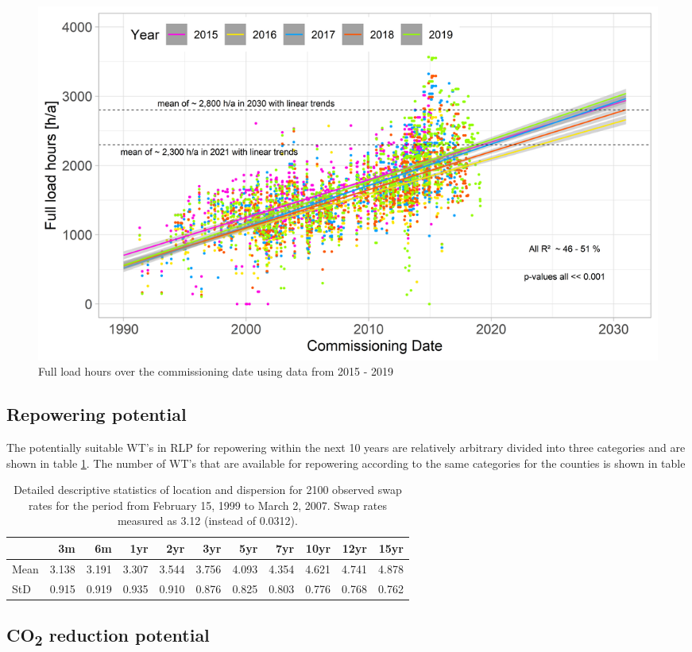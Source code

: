 \documentclass[a4paper,11pt]{article}
\begin{document}
\begin{figure}

{\centering \includegraphics[width=1\linewidth]{data/Amprion/results_of_analysis/flh} 

}

\caption{Full load hours over the commissioning date using data from 2015 - 2019}\label{fig:full}
\end{figure}
\hypertarget{repowering-potential}{%
\subsection{Repowering potential}\label{repowering-potential}}

The potentially suitable WT's in RLP for repowering within the next 10 years are relatively arbitrary divided into three categories and are shown in table \ref{tab:table1}. The number of WT's that are available for repowering according to the same categories for the counties is shown in table
\begin{table}[H]

\caption{\label{tab:table1}Detailed descriptive statistics of location and dispersion for 2100 observed swap rates for the period from February 15, 1999 to March 2, 2007. Swap rates measured as 3.12 (instead of 0.0312).}
\centering
\begin{tabular}[t]{lrrrrrrrrrr}
\toprule
  & 3m & 6m & 1yr & 2yr & 3yr & 5yr & 7yr & 10yr & 12yr & 15yr\\
\midrule
Mean & 3.138 & 3.191 & 3.307 & 3.544 & 3.756 & 4.093 & 4.354 & 4.621 & 4.741 & 4.878\\
StD & 0.915 & 0.919 & 0.935 & 0.910 & 0.876 & 0.825 & 0.803 & 0.776 & 0.768 & 0.762\\
\midrule
\bottomrule
\end{tabular}
\end{table}
\hypertarget{co-reduction-potential}{%
\subsection{\texorpdfstring{CO\textsubscript{2} reduction potential}{CO reduction potential}}\label{co-reduction-potential}}
\end{document}
